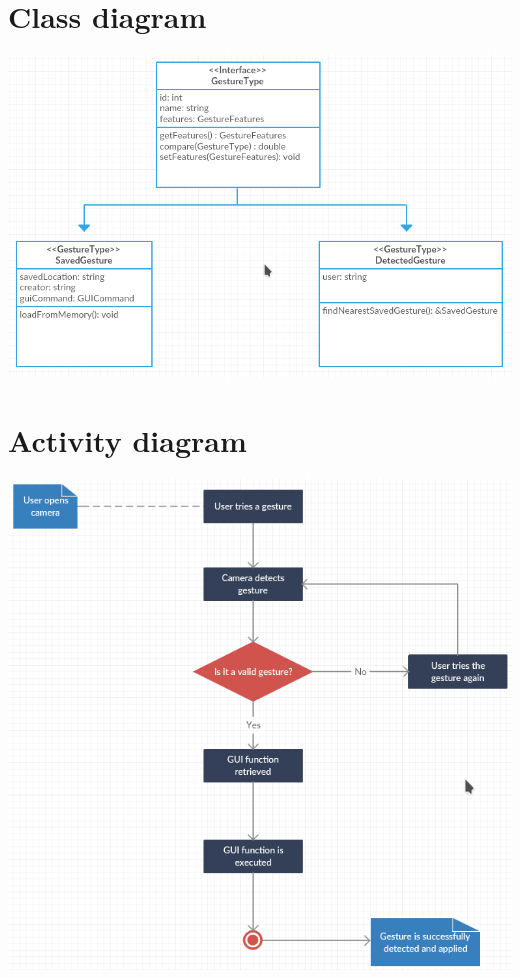 \documentclass{scrreprt}
\begin{document}
\section{Class diagram}
\begin{center}
    \includegraphics[scale=0.8]{classdiagram.png}
\end{center}
\section{Activity diagram}
\begin{center}
    \includegraphics[scale=0.8]{activitydiagram.png}
\end{center}
\end{document}
